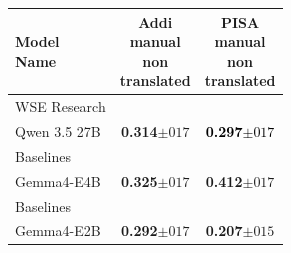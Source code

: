 \begin{tabularx}{\textwidth}{X | c c}
\hline
\makecell[b]{\textbf{Model} \\ \textbf{Name}} & \makecell[b]{\textbf{Addi} \\ \textbf{manual} \\ \textbf{non} \\ \textbf{translated}} & \makecell[b]{\textbf{PISA} \\ \textbf{manual} \\ \textbf{non} \\ \textbf{translated}} \\
\hline
WSE Research\\\subcatarrow{}Qwen 3.5 27B & \textbf{\textcolor{White!50!BrickRed}{0.314$\pm{}017$}} & \textbf{\textcolor{Black}{0.297$\pm{}017$}} \\
Baselines\\\subcatarrow{}Gemma4-E4B & \textbf{\textcolor{BrickRed}{0.325$\pm{}017$}} & \textbf{\textcolor{BrickRed}{0.412$\pm{}017$}} \\
Baselines\\\subcatarrow{}Gemma4-E2B & \textbf{\textcolor{NavyBlue}{0.292$\pm{}017$}} & \textbf{\textcolor{NavyBlue}{0.207$\pm{}015$}} \\
\hline
\end{tabularx}